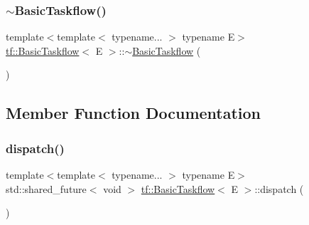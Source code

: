 \mbox{\label{classtf_1_1BasicTaskflow_ae820a9ab3cad471a591da4de749752ae}} 
\subsubsection{\texorpdfstring{$\sim$\+Basic\+Taskflow()}{~BasicTaskflow()}}
{\footnotesize\ttfamily template$<$template$<$ typename... $>$ typename E$>$ \\
\hyperlink{classtf_1_1BasicTaskflow}{tf\+::\+Basic\+Taskflow}$<$ E $>$\+::$\sim$\hyperlink{classtf_1_1BasicTaskflow}{Basic\+Taskflow} (\begin{DoxyParamCaption}{ }\end{DoxyParamCaption})}



\subsection{Member Function Documentation}
\mbox{\label{classtf_1_1BasicTaskflow_a848e425f67b49a8a7ac21f6b791999c5}} 
\subsubsection{\texorpdfstring{dispatch()}{dispatch()}\hspace{0.1cm}{\footnotesize\ttfamily [1/2]}}
{\footnotesize\ttfamily template$<$template$<$ typename... $>$ typename E$>$ \\
std\+::shared\+\_\+future$<$ void $>$ \hyperlink{classtf_1_1BasicTaskflow}{tf\+::\+Basic\+Taskflow}$<$ E $>$\+::dispatch (\begin{DoxyParamCaption}{ }\end{DoxyParamCaption})}

\mbox{\label{classtf_1_1BasicTaskflow_ae644520b734078d061e3ceafc7d982ad}} 
